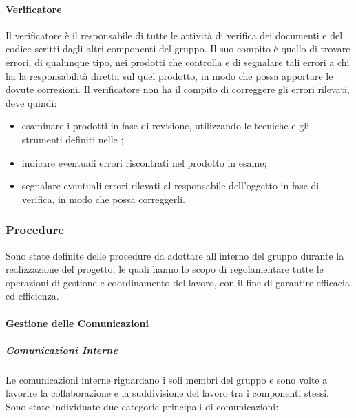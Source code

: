 		\paragraph{Verificatore}
		
			Il verificatore è il responsabile di tutte le attività di verifica dei documenti e del codice scritti dagli altri componenti del gruppo. Il suo compito è quello di trovare errori, di qualunque tipo, nei prodotti che controlla e di segnalare tali errori a chi ha la responsabilità diretta sul quel prodotto, in modo che possa apportare le dovute correzioni.
			\newline
			Il verificatore non ha il compito di correggere gli errori rilevati, deve quindi:
			
			\begin{itemize}
				\item esaminare i prodotti in fase di revisione, utilizzando le tecniche e gli strumenti definiti nelle ;
				\item indicare eventuali errori riscontrati nel prodotto in esame;
				\item segnalare eventuali errori rilevati al responsabile dell'oggetto in fase di verifica, in modo che possa correggerli.
			\end{itemize}	
	
	\subsubsection{Procedure}
		
		Sono state definite delle procedure da adottare all'interno del gruppo durante la realizzazione del progetto, le quali hanno lo scopo di regolamentare tutte le operazioni di gestione e coordinamento del lavoro, con il fine di garantire efficacia ed efficienza.
		
		\paragraph{Gestione delle Comunicazioni}
		
			\subparagraph{Comunicazioni Interne}
			
				Le comunicazioni interne riguardano i soli membri del gruppo e sono volte a favorire la collaborazione e la suddivisione del lavoro tra i componenti stessi.\newline
				Sono state individuate due categorie principali di comunicazioni:
				
